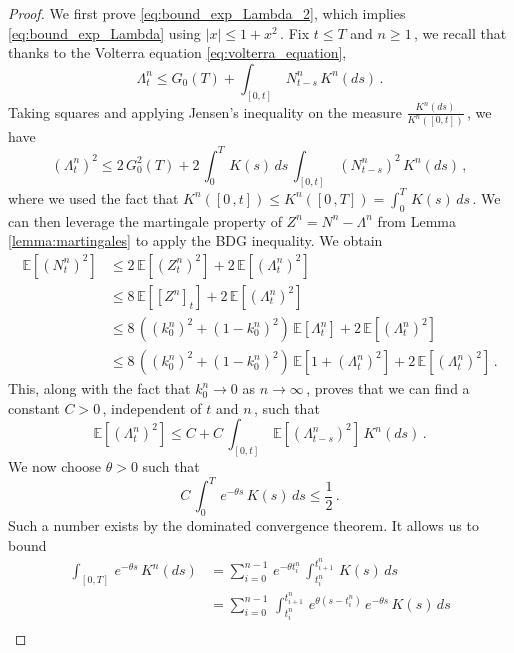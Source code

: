\documentclass{article}
\newcommand{\1}{\mathbbm{1}}
\numberwithin{equation}{section}
\begin{document}
\begin{proof}
    We first prove \eqref{eq:bound_exp_Lambda_2}, which implies \eqref{eq:bound_exp_Lambda} using $|x| \leq 1 + x^2\,$. Fix $t \leq T$ and $n \geq 1\,$, we recall that thanks to the Volterra equation \eqref{eq:volterra_equation},
    $$
    \Lambda_t^n  \leq G_0(T) + \int_{[0,t]}\,N^n_{t-s}\,K^n(ds)\,.
    $$
    Taking squares and applying Jensen's inequality on the measure $\frac{K^n(ds)}{K^n([0,t])}\,$, we have 
    $$
    \left(\Lambda^n_t\right)^2 \leq 2\,G_0^2(T) + 2\,\int_0^T\,K(s)\,ds \,\int_{[0,t]}\,\left(N^n_{t-s}\right)^2\,K^n(ds) \,,
    $$
    where we used the fact that $K^n([0\,,t]) \leq K^n([0\,,T]) = \int_0^T\,K(s)\,ds\,$.
    We can then leverage the martingale property of $Z^n = N^n - \Lambda^n$ from Lemma \ref{lemma:martingales} to apply the BDG inequality. We obtain
    \begin{align*}
        \mathbb E \left[\left(N^n_t\right)^2 \right] &\leq 2\, \mathbb E \left[\left(Z^n_t\right)^2 \right] + 2 \,\mathbb E \left[\left(\Lambda^n_t\right)^2 \right] \\
        &\leq 8\, \mathbb E \left[\left[Z^n\right]_t \right] + 2 \,\mathbb E \left[\left(\Lambda^n_t\right)^2 \right]\\ 
        &\leq 8\,\left(\left(k_0^n\right)^2 + \left(1 - k_0^n\right)^2\right)\,\mathbb E \left[\Lambda^n_t \right] + 2 \,\mathbb E \left[\left(\Lambda^n_t\right)^2 \right]\\
        &\leq 8\,\left(\left(k_0^n\right)^2 + \left(1 - k_0^n\right)^2\right)\,\mathbb E \left[1 + \left(\Lambda_t^n\right)^2 \right] + 2 \,\mathbb E \left[\left(\Lambda^n_t\right)^2 \right]\,.
    \end{align*}
    This, along with the fact that $k_0^n \to 0$ as $n \to \infty\,$, proves that we can find a constant $C > 0\,$, independent of $t$ and $n\,$, such that
    $$
    \mathbb E \left[\left(\Lambda^n_t\right)^2 \right] \leq C + C\,\int_{[0,t]}\,\mathbb E \left[\left(\Lambda^n_{t-s}\right)^2 \right]\,K^n(ds)\,.
    $$
    We now choose $\theta > 0$ such that 
    $$
    C \,\int_0^T\,e^{-\theta s}\,K(s)\,ds \leq \frac{1}{2}\,.
    $$
    Such a number exists by the dominated convergence theorem. It allows us to bound
    \begin{align*}
        \int_{[0,T]}\,e^{- \theta s}\,K^n(ds) &= \sum_{i = 0}^{n-1}\,e^{- \theta t^n_i}\, \int_{t^n_i}^{t^n_{i+1}}\,K(s)\,ds \\
        &= \sum_{i = 0}^{n-1}\,\int_{t^n_i}^{t^n_{i+1}}\,e^{\theta (s - t^n_i)}\,e^{- \theta s}\,K(s)\,ds \\

\end{align*}
\end{proof}
\end{document}
